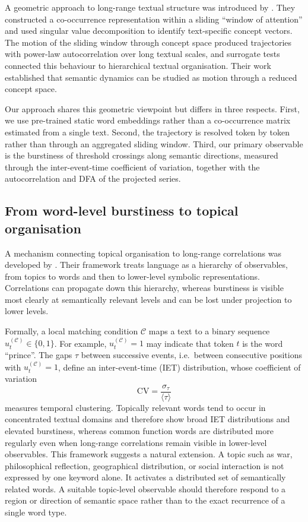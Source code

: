 \documentclass[preprint]{elsarticle}
\newcommand{\meantau}{\langle\tau\rangle}
\newcommand{\sigmatau}{\sigma_\tau}
\newcommand{\CV}{\mathrm{CV}}
\begin{document}
A geometric approach to long-range textual structure was introduced by
\citet{AlvarezLacalle2006}.
They constructed a co-occurrence representation within a sliding
``window of attention'' and used singular value decomposition to identify
text-specific concept vectors.
The motion of the sliding window through concept space produced
trajectories with power-law autocorrelation over long textual scales, and
surrogate tests connected this behaviour to hierarchical textual
organisation.
Their work established that semantic dynamics can be studied as motion
through a reduced concept space.

Our approach shares this geometric viewpoint but differs in three
respects.
First, we use pre-trained static word embeddings rather than a
co-occurrence matrix estimated from a single text.
Second, the trajectory is resolved token by token rather than through an
aggregated sliding window.
Third, our primary observable is the burstiness of threshold crossings
along semantic directions, measured through the inter-event-time
coefficient of variation, together with the autocorrelation and DFA of
the projected series.


\subsection{From word-level burstiness to topical organisation}

A mechanism connecting topical organisation to long-range correlations
was developed by \citet{Altmann2012}.
Their framework treats language as a hierarchy of observables, from
topics to words and then to lower-level symbolic representations.
Correlations can propagate down this hierarchy, whereas burstiness is
visible most clearly at semantically relevant levels and can be lost
under projection to lower levels.

Formally, a local matching condition $\mathcal{C}$ maps a text to a
binary sequence $u_t^{(\mathcal{C})}\in\{0,1\}$.
For example, $u_t^{(\mathcal{C})}=1$ may indicate that token $t$ is the
word ``prince''.
The gaps $\tau$ between successive events, i.e.\ between consecutive
positions with $u_t^{(\mathcal{C})}=1$, define an inter-event-time
(IET) distribution, whose coefficient of variation
\begin{equation}
  \CV=\frac{\sigmatau}{\meantau}
\end{equation}
measures temporal clustering.
Topically relevant words tend to occur in concentrated textual domains
and therefore show broad IET distributions and elevated burstiness,
whereas common function words are distributed more regularly even when
long-range correlations remain visible in lower-level observables.
This framework suggests a natural extension.
A topic such as war, philosophical reflection, geographical
distribution, or social interaction is not expressed by one keyword
alone.
It activates a distributed set of semantically related words.
A suitable topic-level observable should therefore respond to a region
or direction of semantic space rather than to the exact recurrence of a
single word type.
\end{document}
